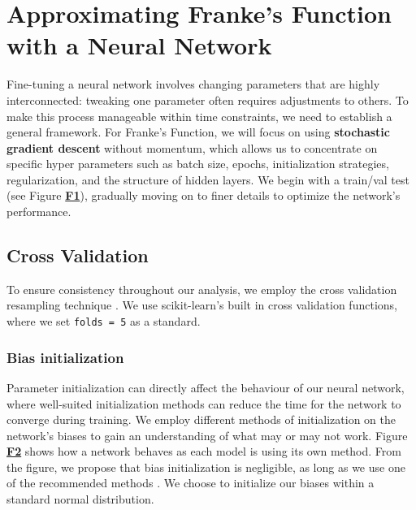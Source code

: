 \documentclass{article}
\begin{document}

\section*{Approximating Franke's Function with a Neural Network}

\begin{multicols}{2}
Fine-tuning a neural network %
involves changing parameters that are highly interconnected: tweaking one parameter often requires adjustments to others. To make this process manageable within time constraints, we need to establish a general framework. For Franke's Function, we will focus on using \textbf{stochastic gradient descent} without momentum, which allows us to concentrate on specific hyper parameters such as batch size, epochs, initialization strategies, regularization, and the structure of hidden layers. We begin with a train/val test (see Figure \hyperref[fig:F1]{\textbf{F1}}), gradually moving on to finer details to optimize the network's performance.

\subsection*{Cross Validation}
To ensure consistency throughout our analysis, we employ the cross validation resampling technique \cite{oa_brovold_eg_hansen_hg_kornstad_regression_2024}. We use scikit-learn's \cite{noauthor_scikit-learnsklearnlinear_model_basepy_nodate} built in cross validation functions, where we set \texttt{folds  = 5} as a standard.

\subsubsection*{Bias initialization}
Parameter initialization can directly affect the behaviour of our neural network, where well-suited initialization methods can reduce the time for the network to converge during training. 
We employ different methods of initialization on the network's biases to gain an understanding of what may or may not work. Figure \hyperref[fig:F2]{\textbf{F2}} shows how a network behaves as each model is using its own method. From the figure, we propose that bias initialization is negligible, as long as we use one of the recommended methods \cite{goodfellow_deep_2016}. We choose to initialize our biases within a standard normal distribution.


\end{multicols}
\end{document}
